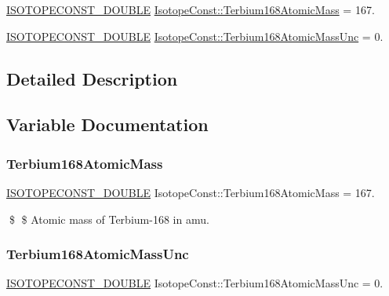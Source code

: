 \begin{DoxyCompactItemize}
\item 
\mbox{\hyperlink{group___isotope_const-_macros_ga8f45a7272ce02c0b4c65c44636ed719a}{I\+S\+O\+T\+O\+P\+E\+C\+O\+N\+S\+T\+\_\+\+D\+O\+U\+B\+LE}} \mbox{\hyperlink{group___isotope_const-_terbium-_tb168_gab405c33ee7764a4a11eb34fff7e69547}{Isotope\+Const\+::\+Terbium168\+Atomic\+Mass}} = 167.
\item 
\mbox{\hyperlink{group___isotope_const-_macros_ga8f45a7272ce02c0b4c65c44636ed719a}{I\+S\+O\+T\+O\+P\+E\+C\+O\+N\+S\+T\+\_\+\+D\+O\+U\+B\+LE}} \mbox{\hyperlink{group___isotope_const-_terbium-_tb168_ga6f31844f17a115f00200ca6c07612f98}{Isotope\+Const\+::\+Terbium168\+Atomic\+Mass\+Unc}} = 0.
\end{DoxyCompactItemize}


\subsection{Detailed Description}


\subsection{Variable Documentation}
\mbox{\label{group___isotope_const-_terbium-_tb168_gab405c33ee7764a4a11eb34fff7e69547}} 
\subsubsection{\texorpdfstring{Terbium168\+Atomic\+Mass}{Terbium168AtomicMass}}
{\footnotesize\ttfamily \mbox{\hyperlink{group___isotope_const-_macros_ga8f45a7272ce02c0b4c65c44636ed719a}{I\+S\+O\+T\+O\+P\+E\+C\+O\+N\+S\+T\+\_\+\+D\+O\+U\+B\+LE}} Isotope\+Const\+::\+Terbium168\+Atomic\+Mass = 167.}

\$ \$ Atomic mass of Terbium-\/168 in amu. \mbox{\label{group___isotope_const-_terbium-_tb168_ga6f31844f17a115f00200ca6c07612f98}} 
\subsubsection{\texorpdfstring{Terbium168\+Atomic\+Mass\+Unc}{Terbium168AtomicMassUnc}}
{\footnotesize\ttfamily \mbox{\hyperlink{group___isotope_const-_macros_ga8f45a7272ce02c0b4c65c44636ed719a}{I\+S\+O\+T\+O\+P\+E\+C\+O\+N\+S\+T\+\_\+\+D\+O\+U\+B\+LE}} Isotope\+Const\+::\+Terbium168\+Atomic\+Mass\+Unc = 0.}

